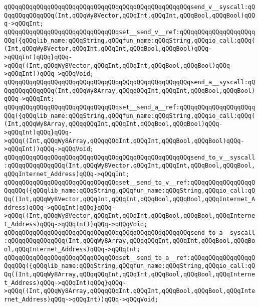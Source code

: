 \verb|qQQqqQQqqQQqqQQqqQQqqQQqqQQqqQQqqQQqqQQqqQQqqQQqqQQqsend_v__syscall:qQQqqQQqqQQqqQQq(Int,qQQqWy8Vector,qQQqInt,qQQqInt,qQQqBool,qQQqBool)qQQq->qQQqInt;|\newline
\verb|qQQqqQQqqQQqqQQqqQQqqQQqqQQqqQQqset__send_v__ref:qQQqqQQqqQQqqQQqqQQqqQQq({qQQqlib_name:qQQqString,qQQqfun_name:qQQqString,qQQqio_call:qQQq((Int,qQQqWy8Vector,qQQqInt,qQQqInt,qQQqBool,qQQqBool)qQQq->qQQqInt)qQQq}qQQq->qQQq((Int,qQQqWy8Vector,qQQqInt,qQQqInt,qQQqBool,qQQqBool)qQQq->qQQqInt))qQQq->qQQqVoid;|\newline
\newline
\verb|qQQqqQQqqQQqqQQqqQQqqQQqqQQqqQQqqQQqqQQqqQQqqQQqqQQqsend_a__syscall:qQQqqQQqqQQqqQQq(Int,qQQqWy8Array,qQQqqQQqInt,qQQqInt,qQQqBool,qQQqBool)qQQq->qQQqInt;|\newline
\verb|qQQqqQQqqQQqqQQqqQQqqQQqqQQqqQQqset__send_a__ref:qQQqqQQqqQQqqQQqqQQqqQQq({qQQqlib_name:qQQqString,qQQqfun_name:qQQqString,qQQqio_call:qQQq((Int,qQQqWy8Array,qQQqqQQqInt,qQQqInt,qQQqBool,qQQqBool)qQQq->qQQqInt)qQQq}qQQq->qQQq((Int,qQQqWy8Array,qQQqqQQqInt,qQQqInt,qQQqBool,qQQqBool)qQQq->qQQqInt))qQQq->qQQqVoid;|\newline
\newline
\verb|qQQqqQQqqQQqqQQqqQQqqQQqqQQqqQQqqQQqqQQqqQQqqQQqqQQqsend_to_v__syscall:qQQqqQQqqQQqqQQq(Int,qQQqWy8Vector,qQQqInt,qQQqInt,qQQqBool,qQQqBool,qQQqInternet_Address)qQQq->qQQqInt;|\newline
\verb|qQQqqQQqqQQqqQQqqQQqqQQqqQQqqQQqset__send_to_v__ref:qQQqqQQqqQQqqQQqqQQqqQQq({qQQqlib_name:qQQqString,qQQqfun_name:qQQqString,qQQqio_call:qQQq((Int,qQQqWy8Vector,qQQqInt,qQQqInt,qQQqBool,qQQqBool,qQQqInternet_Address)qQQq->qQQqInt)qQQq}qQQq->qQQq((Int,qQQqWy8Vector,qQQqInt,qQQqInt,qQQqBool,qQQqBool,qQQqInternet_Address)qQQq->qQQqInt))qQQq->qQQqVoid;|\newline
\newline
\verb|qQQqqQQqqQQqqQQqqQQqqQQqqQQqqQQqqQQqqQQqqQQqqQQqqQQqsend_to_a__syscall:qQQqqQQqqQQqqQQq(Int,qQQqWy8Array,qQQqqQQqInt,qQQqInt,qQQqBool,qQQqBool,qQQqInternet_Address)qQQq->qQQqInt;|\newline
\verb|qQQqqQQqqQQqqQQqqQQqqQQqqQQqqQQqset__send_to_a__ref:qQQqqQQqqQQqqQQqqQQqqQQq({qQQqlib_name:qQQqString,qQQqfun_name:qQQqString,qQQqio_call:qQQq((Int,qQQqWy8Array,qQQqqQQqInt,qQQqInt,qQQqBool,qQQqBool,qQQqInternet_Address)qQQq->qQQqInt)qQQq}qQQq->qQQq((Int,qQQqWy8Array,qQQqqQQqInt,qQQqInt,qQQqBool,qQQqBool,qQQqInternet_Address)qQQq->qQQqInt))qQQq->qQQqVoid;|\newline
\newline
